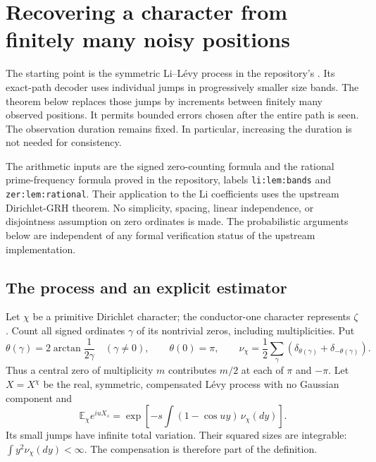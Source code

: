 
\section{Recovering a character from finitely many noisy positions}
\label{sec:noisy-grids}

The starting point is the symmetric Li--L\'evy process in the repository's
. Its exact-path decoder uses individual jumps
in progressively smaller size bands.  The theorem below replaces those jumps
by increments between finitely many observed positions.  It permits bounded
errors chosen after the entire path is seen.  The observation duration remains
fixed.  In particular, increasing the duration is not needed for consistency.

The arithmetic inputs are the signed zero-counting formula and the rational
prime-frequency formula proved in the repository, labels
\texttt{li:lem:bands} and \texttt{zer:lem:rational}.  Their application to the
Li coefficients uses the upstream Dirichlet-GRH theorem.  No simplicity,
spacing, linear independence, or disjointness assumption on zero ordinates is
made.  The probabilistic arguments below are independent of any formal
verification status of the upstream implementation.

\subsection{The process and an explicit estimator}

Let $\chi$ be a primitive Dirichlet character; the conductor-one character
represents $\zeta$.  Count all signed ordinates $\gamma$ of its nontrivial
zeros, including multiplicities.  Put
\[
 \theta(\gamma)=2\arctan\frac1{2\gamma}\quad(\gamma\ne0),\qquad
 \theta(0)=\pi,\qquad
 \nu_\chi=\frac12\sum_\gamma
       (\delta_{\theta(\gamma)}+\delta_{-\theta(\gamma)}).
\]
Thus a central zero of multiplicity $m$ contributes $m/2$ at each of
$\pi$ and $-\pi$.  Let $X=X^\chi$ be the real, symmetric, compensated
L\'evy process with no Gaussian component and
\[
 \mathbb E_\chi e^{iuX_s}
 =\exp\left[-s\int(1-\cos uy)\,\nu_\chi(dy)\right].
\]
Its small jumps have infinite total variation.  Their squared sizes are
integrable: $\int y^2\nu_\chi(dy)<\infty$.  The compensation is therefore
part of the definition.

